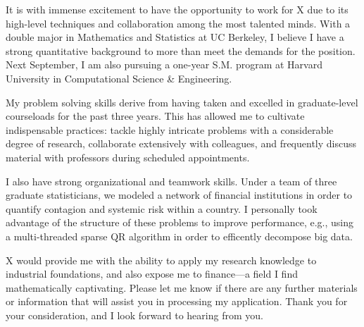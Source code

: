 \documentclass[10pt,stdletter,dateno,sigleft]{newlfm}
\newcommand{\employer}{X}
\begin{document}
\begin{newlfm}



It is with immense excitement to have the opportunity to work for \employer{} due to its {high-level techniques and collaboration among the most talented minds.} With a double major in Mathematics and Statistics at UC Berkeley, I believe I have a strong {quantitative} background to more than meet the demands for {the position}. Next September, I am also pursuing a one-year S.M. program at Harvard University in Computational Science \& Engineering.

My {problem solving skills} derive from having taken and excelled in graduate-level courseloads for the past three years. This has allowed me to cultivate indispensable practices: tackle highly intricate problems with a considerable degree of research, collaborate extensively with colleagues, and frequently discuss material with professors during scheduled appointments.

I also have strong {organizational and teamwork} skills. Under a team of three graduate statisticians, we modeled a network of financial institutions in order to quantify contagion and systemic risk within a country. I personally took advantage of the structure of these problems to improve performance, e.g., using a multi-threaded sparse QR algorithm in order to efficently decompose big data.

\employer{} would provide me with the ability to apply my research knowledge to industrial foundations, and also expose me to {finance}---a field I find mathematically captivating. Please let me know if there are any further materials or information that will assist you in processing my application. Thank you for your consideration, and I look forward to hearing from you.

\end{newlfm}
\end{document}
